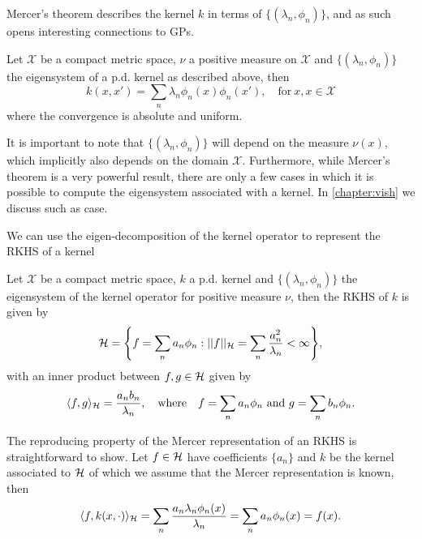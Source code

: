 Mercer's theorem describes the kernel $k$ in terms of $\{(\lambda_n, \phi_n)\}$, and as such opens interesting connections to GPs.
\begin{theorem}[Mercer]
  Let $\mathcal{X}$ be a compact metric space, $\nu$ a positive measure on $\mathcal{X}$ and $\{(\lambda_n, \phi_n)\}$ the eigensystem of a p.d. kernel as described above, then
\begin{equation}
  k(x,x')  = \sum_n \lambda_n \phi_n(x) \phi_n(x'),\quad\text{for}\ x,x\in \mathcal{X}
\end{equation}
where the convergence is absolute and uniform.
\end{theorem}
It is important to note that $\{(\lambda_n, \phi_n)\}$ will depend on the measure $\nu(x)$, which implicitly also depends on the domain $\mathcal{X}$. Furthermore, while Mercer's theorem is a very powerful result, there are only a few cases in which it is possible to compute the eigensystem associated with a kernel. In \cref{chapter:vish} we discuss such as case.

We can use the eigen-decomposition of the kernel operator to represent the RKHS of a kernel
\begin{theorem}
  Let $\mathcal{X}$ be a compact metric space, $k$ a p.d. kernel and $\{(\lambda_n, \phi_n)\}$ the eigensystem of the kernel operator for positive measure $\nu$, then the RKHS of $k$ is given by
\begin{equation}
    \label{eq:mercer-rkhs}
    \rkhs = \left\{
    f = \sum_n a_n \phi_{n}:
    \norm{f}_{\rkhs} = \sum_n \frac{a_n^2}{\lambda_n} < \infty
    \right\},
\end{equation}
with an inner product between $f,g \in {\mathcal{H}}$ given by
\begin{equation}
  \langle f, g \rangle_{\rkhs} = \frac{a_n b_n}{\lambda_n},\quad\text{where}\quad f = \sum_n a_n \phi_n\ \text{and}\ g = \sum_n b_n \phi_n.
\end{equation}
\end{theorem}
The reproducing property of the Mercer representation of an RKHS is straightforward to show. Let $f \in {\mathcal{H}}$ have coefficients $\{a_n\}$ and $k$ be the kernel associated to ${\mathcal{H}}$ of which we assume that the Mercer representation is known, then
\begin{equation}
  \langle f, k(x, \cdot) \rangle_{{\mathcal{H}}} = \sum_n \frac{a_n \lambda_n \phi_n(x)}{\lambda_n} = \sum_n a_n \phi_n(x) = f(x).
\end{equation}

